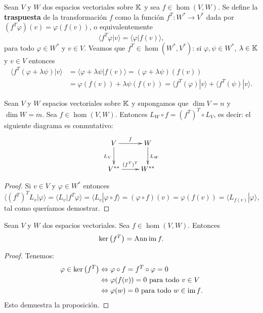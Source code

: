 \begin{block}
    Sean $V$ y $W$ dos espacios vectoriales sobre $\mathbb{K}$ y sea $f\in\hom(V,W)$.
    Se define la \textbf{traspuesta} de la transformación $f$ como la función
    $f^T\colon W^* \to V^*$ dada por 
    $(f^T\varphi)(v)=\varphi(f(v))$, o equivalentemente 
    \[
        \langle f^T\varphi|v\rangle=\langle\varphi|f(v)\rangle,
    \]
    para todo $\varphi\in W^*$ y $v\in V$. Veamos que
    $f^T\in\hom(W^*,V^*)$: si $\varphi,\psi\in W^*$, $\lambda\in\mathbb{K}$ y $v\in V$ entonces
	\begin{align*}
        \langle f^T(\varphi+\lambda\psi)|v\rangle&=
        \langle \varphi+\lambda\psi|f(v)\rangle=
        \left(\varphi+\lambda\psi\right)(f(v))\\
        &=\varphi(f(v))+\lambda\psi(f(v))
		=\langle f^T(\varphi)|v\rangle+\langle f^T(\psi)|v\rangle.
	\end{align*}
\end{block}

\begin{prop}
    Sean $V$ y $W$ espacios vectoriales sobre $\mathbb{K}$ y supongamos que $\dim V=n$
    y $\dim W=m$. Sea $f\in\hom(V,W)$. Entonces $L_W\circ f=(f^T)^T\circ L_V$,
    es decir: el siguiente diagrama es conmutativo:
    \[
    \xymatrix{
    V
    \ar[d]_{L_V}
    \ar[r]^-{f}
    & W
    \ar[d]^{L_W}
    \\
    V^{**}
    \ar[r]^-{(f^T)^T}
    & W^{**}
    }
    \]

    \begin{proof}
        Si $v\in V$ y $\varphi\in W^*$ entonces 
        \[
            \langle (f^T)^TL_v|\varphi\rangle=\langle L_v|f^T\varphi\rangle=\langle L_v|\varphi\circ f\rangle
			=(\varphi\circ f)(v)=\varphi(f(v))=\langle L_{f(v)}|\varphi\rangle,
        \]
        tal como queríamos demostrar.
    \end{proof}
\end{prop}

\begin{prop}
    \label{pro:ker(fT)=ann(imf)}
    Sean $V$ y $W$ dos espacios vectoriales. Sea 
    $f\in\hom(V,W)$. Entonces
    \[
        \ker\left(f^T\right)=\operatorname{Ann}\operatorname{im} f.
    \]

    \begin{proof}
        Tenemos:
        \begin{align*}
            \varphi\in\ker\left(f^T\right) & \Leftrightarrow \varphi\circ f=f^T\circ\varphi=0\\
            & \Leftrightarrow \varphi(f(v))=0\text{ para todo $v\in V$}\\
            & \Leftrightarrow \varphi(w)=0\text{ para todo $w\in\operatorname{im} f$}.
        \end{align*}
        Esto demuestra la proposición.
    \end{proof}
\end{prop}

